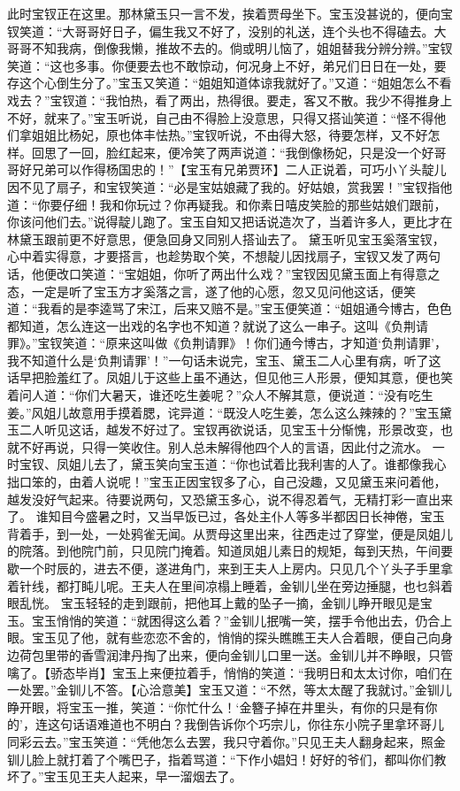 \documentclass[12pt,oneside]{book}
\begin{document}
此时宝钗正在这里。那林黛玉只一言不发，挨着贾母坐下。宝玉没甚说的，便向宝钗笑道：“大哥哥好日子，偏生我又不好了，没别的礼送，连个头也不得磕去。大哥哥不知我病，倒像我懒，推故不去的。倘或明儿恼了，姐姐替我分辨分辨。”宝钗笑道：“这也多事。你便要去也不敢惊动，何况身上不好，弟兄们日日在一处，要存这个心倒生分了。”宝玉又笑道：“姐姐知道体谅我就好了。”又道：“姐姐怎么不看戏去？”宝钗道：“我怕热，看了两出，热得很。要走，客又不散。我少不得推身上不好，就来了。”宝玉听说，自己由不得脸上没意思，只得又搭讪笑道：“怪不得他们拿姐姐比杨妃，原也体丰怯热。”宝钗听说，不由得大怒，待要怎样，又不好怎样。回思了一回，脸红起来，便冷笑了两声说道：“我倒像杨妃，只是没一个好哥哥好兄弟可以作得杨国忠的！”【宝玉有兄弟贾环】二人正说着，可巧小丫头靛儿因不见了扇子，和宝钗笑道：“必是宝姑娘藏了我的。好姑娘，赏我罢！”宝钗指他道：“你要仔细！我和你玩过？你再疑我。和你素日嘻皮笑脸的那些姑娘们跟前，你该问他们去。”说得靛儿跑了。宝玉自知又把话说造次了，当着许多人，更比才在林黛玉跟前更不好意思，便急回身又同别人搭讪去了。
黛玉听见宝玉奚落宝钗，心中着实得意，才要搭言，也趁势取个笑，不想靛儿因找扇子，宝钗又发了两句话，他便改口笑道：“宝姐姐，你听了两出什么戏？”宝钗因见黛玉面上有得意之态，一定是听了宝玉方才奚落之言，遂了他的心愿，忽又见问他这话，便笑道：“我看的是李逵骂了宋江，后来又赔不是。”宝玉便笑道：“姐姐通今博古，色色都知道，怎么连这一出戏的名字也不知道？就说了这么一串子。这叫《负荆请罪》。”宝钗笑道：“原来这叫做《负荆请罪》！你们通今博古，才知道‘负荆请罪’，我不知道什么是‘负荆请罪’！”一句话未说完，宝玉、黛玉二人心里有病，听了这话早把脸羞红了。凤姐儿于这些上虽不通达，但见他三人形景，便知其意，便也笑着问人道：“你们大暑天，谁还吃生姜呢？”众人不解其意，便说道：“没有吃生姜。”风姐儿故意用手摸着腮，诧异道：“既没人吃生姜，怎么这么辣辣的？”宝玉黛玉二人听见这话，越发不好过了。宝钗再欲说话，见宝玉十分惭愧，形景改变，也就不好再说，只得一笑收住。别人总未解得他四个人的言语，因此付之流水。
一时宝钗、凤姐儿去了，黛玉笑向宝玉道：“你也试着比我利害的人了。谁都像我心拙口笨的，由着人说呢！”宝玉正因宝钗多了心，自己没趣，又见黛玉来问着他，越发没好气起来。待要说两句，又恐黛玉多心，说不得忍着气，无精打彩一直出来了。
谁知目今盛暑之时，又当早饭已过，各处主仆人等多半都因日长神倦，宝玉背着手，到一处，一处鸦雀无闻。从贾母这里出来，往西走过了穿堂，便是凤姐儿的院落。到他院门前，只见院门掩着。知道凤姐儿素日的规矩，每到天热，午间要歇一个时辰的，进去不便，遂进角门，来到王夫人上房内。只见几个丫头子手里拿着针线，都打盹儿呢。王夫人在里间凉榻上睡着，金钏儿坐在旁边捶腿，也乜斜着眼乱恍。
宝玉轻轻的走到跟前，把他耳上戴的坠子一摘，金钏儿睁开眼见是宝玉。宝玉悄悄的笑道：“就困得这么着？”金钏儿抿嘴一笑，摆手令他出去，仍合上眼。宝玉见了他，就有些恋恋不舍的，悄悄的探头瞧瞧王夫人合着眼，便自己向身边荷包里带的香雪润津丹掏了出来，便向金钏儿口里一送。金钏儿并不睁眼，只管噙了。【骄态毕肖】宝玉上来便拉着手，悄悄的笑道：“我明日和太太讨你，咱们在一处罢。”金钏儿不答。【心洽意美】宝玉又道：“不然，等太太醒了我就讨。”金钏儿睁开眼，将宝玉一推，笑道：“你忙什么！‘金簪子掉在井里头，有你的只是有你的’，连这句话语难道也不明白？我倒告诉你个巧宗儿，你往东小院子里拿环哥儿同彩云去。”宝玉笑道：“凭他怎么去罢，我只守着你。”只见王夫人翻身起来，照金钏儿脸上就打着了个嘴巴子，指着骂道：“下作小娼妇！好好的爷们，都叫你们教坏了。”宝玉见王夫人起来，早一溜烟去了。
\end{document}
